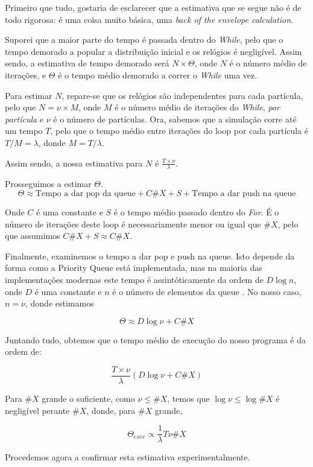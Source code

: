 \documentclass{article}
\begin{document}
	Primeiro que tudo, gostaria de esclarecer que a estimativa que se segue não é de todo rigorosa: é uma coisa muito básica, uma \emph{back of the envelope calculation}.
	
	Suporei que a maior parte do tempo é passada dentro do \emph{While}, pelo que o tempo demorado a popular a distribuição inicial e os relógios é negligível. Assim sendo, a estimativa de tempo demorado será $N \times \Theta$, onde $N$ é o número médio de iterações, e $\Theta$ é o tempo médio demorado a correr o \emph{While} uma vez.
	
	Para estimar $N$, repare-se que os relógios são independentes para cada partícula, pelo que $N = \nu \times M$, onde $M$ é o número médio de iterações do \emph{While}, \emph{por partícula} e $\nu$ é o número de partículas. Ora, sabemos que a simulação corre até um tempo $T$, pelo que o tempo médio entre iterações do loop por cada partícula é $T/M = \lambda$, donde $M = T/\lambda$.
	
	Assim sendo, a nossa estimativa para $N$ é $\frac{T \times \nu}\lambda$.
	
	Prosseguimos a estimar $\Theta$.
	\[\Theta \approx \text{Tempo a dar pop da queue} + C \#X + S + \text{Tempo a dar push na queue}\]
	
	Onde $C$ é uma constante e $S$ é o tempo médio passado dentro do \emph{For}. É o número de iterações deste loop é necessariamente menor ou igual que $\#X$, pelo que assumimos $C \#X + S \approx C \#X$.
	
	Finalmente, examinemos o tempo a dar pop e push na queue. Isto depende da forma como a Priority Queue está implementada, mas na maioria das implementações modernas este tempo é assintóticamente da ordem de $D \log n$, onde $D$ é uma constante e $n$ é o número de elementos da queue \cite{wiki}. No nosso caso, $n = \nu$, donde estimamos
	
	\[\Theta \approx D \log \nu + C \#X\]
	
	Juntando tudo, obtemos que o tempo médio de execução do nosso programa é da ordem de:
	
	\[\frac{T \times \nu}\lambda (D \log \nu + C \#X)\]
	
	Para $\#X$ grande o suficiente, como $\nu \leq \#X$, temos que $\log \nu \leq \log \#X$ é negligível perante $\#X$, donde, para $\#X$ grande,
	
	\[\Theta_{exec} \propto \frac 1 \lambda T \nu \#\!X\]
	
	Procedemos agora a confirmar esta estimativa experimentalmente.
	
\end{document}
